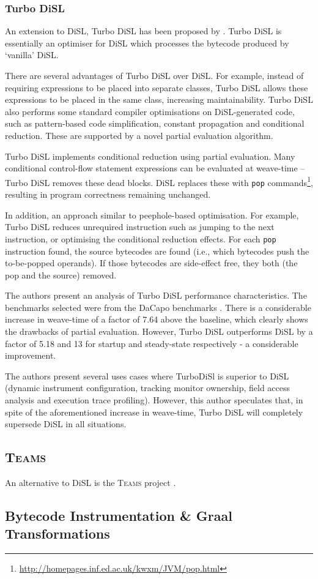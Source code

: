 		\subsubsection{Turbo DiSL} \label{sec:instrumentation/hybrid/disl/turbo}
		An extension to DiSL, Turbo DiSL has been proposed by \citet[p.~353-368]{Furia2012}. Turbo DiSL is essentially an optimiser for DiSL which processes the bytecode produced by `vanilla' DiSL.
		
		There are several advantages of Turbo DiSL over DiSL. For example, instead of requiring expressions to be placed into separate classes, Turbo DiSL allows these expressions to be placed in the same class, increasing maintainability. Turbo DiSL also performs some standard compiler optimisations on DiSL-generated code, such as pattern-based code simplification, constant propagation and conditional reduction. These are supported by a novel partial evaluation algorithm.
		
		Turbo DiSL implements conditional reduction using partial evaluation. Many conditional control-flow statement expressions can be evaluated at weave-time -- Turbo DiSL removes these dead blocks. DiSL replaces these with \texttt{pop} commands\footnote{\url{http://homepages.inf.ed.ac.uk/kwxm/JVM/pop.html}}, resulting in program correctness remaining unchanged.
		
		In addition, an approach similar to peephole-based optimisation. For example, Turbo DiSL reduces unrequired instruction such as jumping to the next instruction, or optimising the conditional reduction effects. For each \texttt{pop} instruction found, the source bytecodes are found (i.e., which bytecodes push the to-be-popped operands). If those bytecodes are side-effect free, they both (the pop and the source) removed.
		
		The authors present an analysis of Turbo DiSL performance characteristics. The benchmarks selected were from the DaCapo benchmarks \citep{Blackburn2006}. There is a considerable increase in weave-time of a factor of 7.64 above the baseline, which clearly shows the drawbacks of partial evaluation. However, Turbo DiSL outperforms DiSL by a factor of 5.18 and 13 for startup and steady-state respectively - a considerable improvement.

		The authors present several uses cases where TurboDiSl is superior to DiSL (dynamic instrument configuration, tracking monitor ownership, field access analysis and execution trace profiling). However, this author speculates that, in spite of the aforementioned increase in weave-time, Turbo DiSL will completely supersede DiSL in all situations. 
		
	\subsection{\textsc{Teams}} \label{sec:instrumentation/hybrid/teams}
	An alternative to DiSL is the \textsc{Teams} project \citep{Rahnavard2013}.
		
	\subsection{Bytecode Instrumentation \& Graal Transformations} \label{sec:instrumentation/hybrid/graalbytecode}